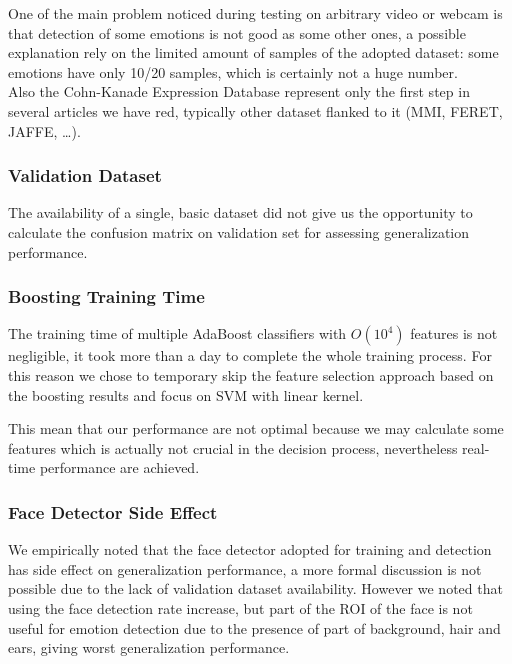 One of the main problem noticed during testing on arbitrary video or webcam is that detection of some emotions is not good as some other ones, a possible explanation rely on the limited amount of samples of the adopted dataset: some emotions have only 10/20 samples, which is certainly not a huge number.\\
Also the Cohn-Kanade Expression Database represent only the first step in several articles we have red, typically other dataset flanked to it (MMI, FERET, JAFFE, \ldots).

\subsubsection*{Validation Dataset}

The availability of a single, basic dataset did not give us the opportunity to calculate the confusion matrix on validation set for assessing generalization performance. 

\subsubsection*{Boosting Training Time}

The training time of multiple AdaBoost classifiers with $O(10^4)$ features is not negligible, it took more than a day to complete the whole training process. For this reason we chose to temporary skip the feature selection approach based on the boosting results and focus on SVM with linear kernel. 

This mean that our performance are not optimal because we may calculate some features which is actually not crucial in the decision process, nevertheless real-time performance are achieved.

\subsubsection*{Face Detector Side Effect}

We empirically noted that the face detector adopted for training and detection has side effect on generalization performance, a more formal discussion is not possible due to the lack of validation dataset availability. However we noted that using  the face detection rate increase, but part of the ROI of the face is not useful for emotion detection due to the presence of part of background, hair and ears, giving worst generalization performance.

